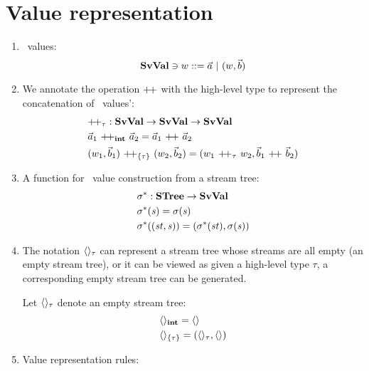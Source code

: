 \section{Value representation}
\begin{enumerate}[(1)]
	\item \fmsvcode \  values: $$\SvVal \ni \v ::= \a \ | \ (\v,\b) $$
	
	\item We annotate the operation ${\++}$ with the high-level type to represent the concatenation of \fmsvcode \  values': 
	\begin{align*}
	&{\++}_{\tau}: \SvVal \->  \SvVal \-> \SvVal \\
	& \a_1 \ {\++}_{\int}  \ \a_2 = \a_1 \ {\++} \ \a_2 \\
	&{(w_1,\b_1)} \ {\++}_{\{\tau\}} \  {(w_2,\b_2)} = ({w_1} \ {\++}_{\tau} \ {w_2}, {\b_1} \ {\++} \ {\b_2})
	\end{align*}
	
	\item A function for \fmsvcode \  value construction from a stream tree:
	\begin{align*}
	&\sgm^* : \STree \-> \SvVal \\
	&\sgm^*(\s) = \sgm(\s) \\
	&\sgm^*((\st,\s)) = (\sgm^*(\st), \sgm(\s)) 
	\end{align*}

\item The notation $\langle \rangle_{\tau}$ can represent a stream tree whose streams are all empty (an empty stream  tree), or it can be viewed as given a high-level type $\tau$, a corresponding empty stream tree can be generated.
\begin{nota}
	Let $\langle \rangle_{\tau}$ denote an empty stream tree: 
	\begin{align*}
	&\langle \rangle_{\mathbf{int}} = \langle \rangle \\
	&\langle \rangle_{\{\tau\}} = (\langle \rangle_{\tau},\langle \rangle) 
	\end{align*}
\end{nota}


\item Value representation rules: \\
	
		
		\\
		

\end{enumerate}
